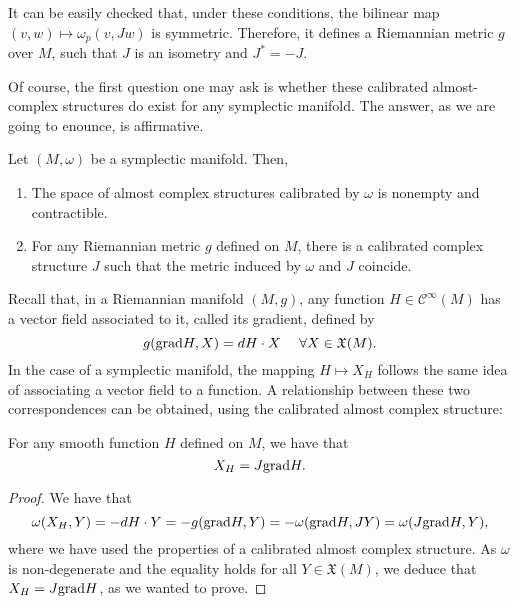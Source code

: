 It can be easily checked that, under these conditions, the bilinear map $(v,w) \mapsto \omega_p(v,Jw)$ is symmetric. Therefore, it defines a Riemannian metric $g$ over $M$, such that $J$ is an isometry and $J^{\ast} = - J$.

Of course, the first question one may ask is whether these calibrated almost-complex structures do exist for any symplectic manifold. The answer, as we are going to enounce, is affirmative.

\begin{prop} Let $(M,\omega)$ be a symplectic manifold. Then,

\begin{enumerate}
	\item The space of almost complex structures calibrated by $\omega$ is nonempty and contractible.
	\item For any Riemannian metric $g$ defined on $M$, there is a calibrated complex structure $J$ such that the metric induced by $\omega$ and $J$ coincide.
\end{enumerate}
\end{prop}

Recall that, in a Riemannian manifold $(M,g)$, any function $H \in \mathcal{C}^{\infty}(M)$ has a vector field associated to it, called its gradient, defined by
\[g(\mathrm{grad} H, X) = d H \cdot X \ \ \ \ \forall X \in \mathfrak{X}(M) .\]
In the case of a symplectic manifold, the mapping $H \mapsto X_H$ follows the same idea of associating a vector field to a function. A relationship between these two correspondences can be obtained, using the calibrated almost complex structure:

\begin{prop} \label{prop:symplectic_gradient}
For any smooth function $H$ defined on $M$, we have that
\[X_H = J \mathrm{grad} H .\]
\end{prop}

\begin{proof}
We have that
\[\omega(X_H,Y) = - d H \cdot Y = - g(\mathrm{grad} H,Y) = - \omega(\mathrm{grad} H,JY) = \omega(J \mathrm{grad} H, Y) ,\]
where we have used the properties of a calibrated almost complex structure. As $\omega$ is non-degenerate and the equality holds for all $Y \in \mathfrak{X}(M)$, we deduce that $X_H = J \mathrm{grad} H$, as we wanted to prove.
\end{proof}
